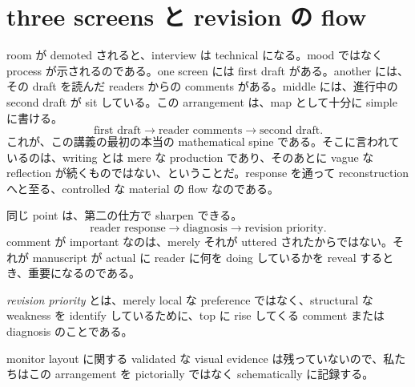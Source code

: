 \section{three screens と revision の flow}

room が demoted されると、interview は technical になる。mood ではなく process が示されるのである。one screen には first draft がある。another には、その draft を読んだ readers からの comments がある。middle には、進行中の second draft が sit している。この arrangement は、map として十分に simple に書ける。
\begin{equation}
\text{first draft} \to \text{reader comments} \to \text{second draft}.
\end{equation}
これが、この講義の最初の本当の mathematical spine である。そこに言われているのは、writing とは mere な production であり、そのあとに vague な reflection が続くものではない、ということだ。response を通って reconstruction へと至る、controlled な material の flow なのである。

同じ point は、第二の仕方で sharpen できる。
\begin{equation}
\text{reader response} \to \text{diagnosis} \to \text{revision priority}.
\end{equation}
comment が important なのは、merely それが uttered されたからではない。それが manuscript が actual に reader に何を doing しているかを reveal するとき、重要になるのである。

\begin{definition}
\emph{revision priority} とは、merely local な preference ではなく、structural な weakness を identify しているために、top に rise してくる comment または diagnosis のことである。
\end{definition}

monitor layout に関する validated な visual evidence は残っていないので、私たちはこの arrangement を pictorially ではなく schematically に記録する。

\begin{figure}[h]
\centering
{}
\end{figure}

